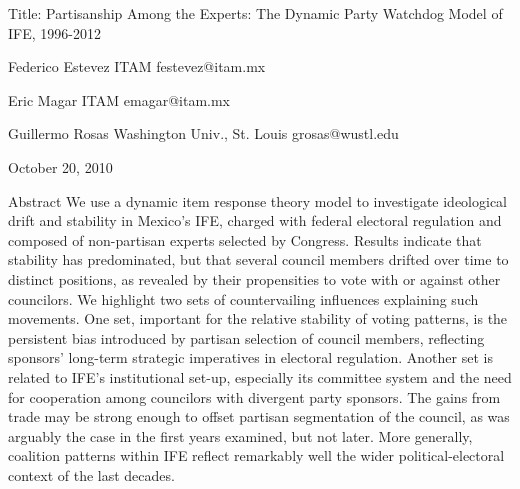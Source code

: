 Title: Partisanship Among the Experts: The Dynamic Party Watchdog Model of IFE, 1996-2012


Federico Estevez
ITAM
festevez@itam.mx

Eric Magar
ITAM
emagar@itam.mx

Guillermo Rosas
Washington Univ., St. Louis
grosas@wustl.edu

October 20, 2010

Abstract
We use a dynamic item response theory model to investigate ideological drift and stability in Mexico's IFE, charged with federal electoral regulation and composed of non-partisan experts selected by Congress. Results indicate that stability has predominated, but that several council members drifted over time to distinct positions, as revealed by their propensities to vote with or against other councilors. We highlight two sets of countervailing influences explaining such movements. One set, important for the relative stability of voting patterns, is the persistent bias introduced by partisan selection of council members, reflecting sponsors' long-term strategic imperatives in electoral regulation. Another set is related to IFE's institutional set-up, especially its committee system and the need for cooperation among councilors with divergent party sponsors. The gains from trade may be strong enough to offset partisan segmentation of the council, as was arguably the case in the first years examined, but not later. More generally, coalition patterns within IFE reflect remarkably well the wider political-electoral context of the last decades.

